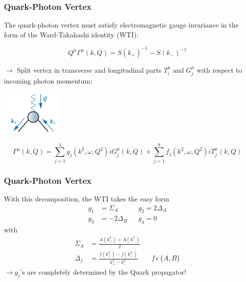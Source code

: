   \begin{frame}\frametitle{Quark-Photon Vertex}
  The quark-photon vertex must satisfy electromagnetic gauge invariance in the form of the
  Ward-Takahashi identity (WTI):

  \begin{equation}
  	Q^\mu\Gamma^\mu(k, Q)=S(k_+)^{-1}-S(k_-)^{-1}
  \end{equation}

  \begin{minipage}[r]{0.65\textwidth}
  	$\rightarrow$ Split vertex in transverse and longitudinal parts $T_i^{\mu} \; \text{and} \; G_j^{\mu} $ with respect to incoming photon momentum:
  \end{minipage}
  \begin{minipage}[r]{0.30\textwidth}
  	\hspace{2mm}
  	\includegraphics[height=2.2cm, width=3.2cm]{Vertex.png}
  \end{minipage}

  \begin{equation}
  	\Gamma^\mu(k,Q)=\sum_{j=1}^4 g_j(k^2, \omega, Q^2)iG^\mu_j(k, Q)+\sum_{j=1}^8 f_j(k^2, \omega, Q^2)iT^\mu_j(k, Q)
  \end{equation}
\end{frame}

\begin{frame}\frametitle{Quark-Photon Vertex}
  With this decomposition, the WTI takes the easy form
  \begin{align}
    g_1 &= \Sigma_A && g_2=2\Delta_A \\\nonumber
    g_3&= -2\Delta_B && g_4=0
  \end{align}
  with
  \begin{align}
    \Sigma_A&=\frac{A(k_+^2) + A(k_-^2)}{2} \\\nonumber
    \Delta_f&=\frac{f(k_+^{2}) - f(k_-^2)}{k_+^2 - k_{-}^2} && f\, \epsilon \, \lbrace A,B \rbrace
  \end{align}
  $\rightarrow g_j$'s are completely determined by the Quark propagator!
\end{frame}


\endinput
